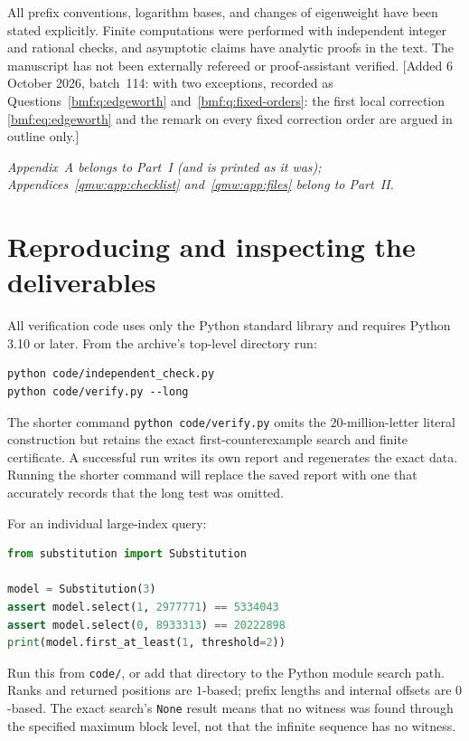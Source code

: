 \documentclass[11pt]{article}
\numberwithin{equation}{section}
\theoremstyle{definition}
\theoremstyle{remark}
\begin{document}
All prefix conventions, logarithm bases, and changes of
eigenweight have been stated explicitly. Finite computations
were performed with independent integer and rational checks,
and asymptotic claims have analytic proofs in the text.
The manuscript has not been externally refereed or
proof-assistant verified.
[Added 6 October 2026, batch~114: with two exceptions, recorded as
Questions~\ref{bmf:q:edgeworth} and~\ref{bmf:q:fixed-orders}: the first
local correction \eqref{bmf:eq:edgeworth} and the remark on every fixed
correction order are argued in outline only.]

\renewcommand{\thetable}{\arabic{table}}
\renewcommand{\theHtable}{\arabic{table}}
\setcounter{table}{2}
\clearpage
\appendix
\noindent\emph{Appendix~A belongs to Part~I (and is printed as it was);
Appendices~\ref{qmw:app:checklist} and~\ref{qmw:app:files} belong to
Part~II.}

\section{Reproducing and inspecting the deliverables}\label{app:reproduce}

All verification code uses only the Python standard library and requires
Python 3.10 or later. From the archive's top-level directory run:
\begin{lstlisting}
python code/independent_check.py
python code/verify.py --long
\end{lstlisting}
The shorter command \texttt{python code/verify.py} omits the
$20$-million-letter literal construction but retains the exact
first-counterexample search and finite certificate. A successful run
writes its own report and regenerates the exact data. Running the shorter
command will replace the saved report with one that accurately records
that the long test was omitted.

For an individual large-index query:
\begin{lstlisting}[language=Python]
from substitution import Substitution

model = Substitution(3)
assert model.select(1, 2977771) == 5334043
assert model.select(0, 8933313) == 20222898
print(model.first_at_least(1, threshold=2))
\end{lstlisting}
Run this from \texttt{code/}, or add that directory to the Python module
search path. Ranks and returned positions are $1$-based; prefix lengths
and internal offsets are $0$-based. The exact search's \texttt{None}
result means that no witness was found through the specified maximum
block level, not that the infinite sequence has no witness.
\end{document}
